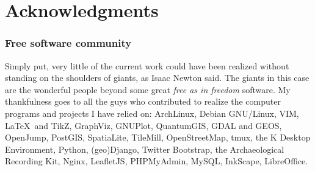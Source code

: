 \chapter*{Acknowledgments}

    \subsection*{Free software community}
        Simply put, very little of the current work could have been realized without standing on the shoulders of giants, as Isaac Newton said. The giants in this case are the wonderful people beyond some great \emph{free as in freedom} software. My thankfulness goes to all the guys who contributed to realize the computer programs and projects I have relied on: ArchLinux, Debian GNU/Linux, VIM, \LaTeX~and TikZ, GraphViz, GNUPlot, QuantumGIS, GDAL and GEOS, OpenJump, PostGIS, SpatiaLite, TileMill, OpenStreetMap, tmux, the K Desktop Environment, Python, (geo)Django, Twitter Bootstrap, the Archaeological Recording Kit, Nginx, LeafletJS, PHPMyAdmin, MySQL, InkScape, LibreOffice.
